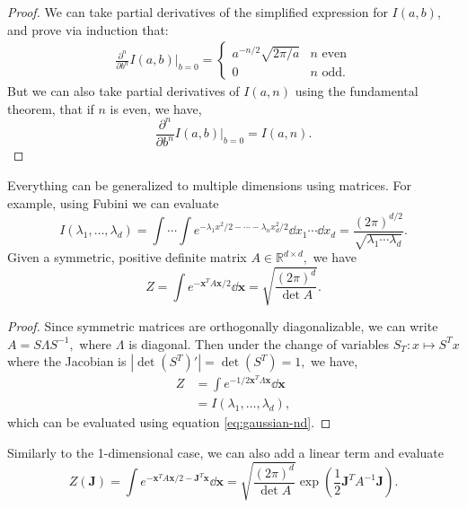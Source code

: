 \documentclass{article}
\numberwithin{equation}{section}
\begin{document}
\begin{proof}
    We can take partial derivatives of the simplified expression for $I(a,b)$, and prove via induction that:
    \begin{align*}
        \frac{\partial^n}{\partial b^n}I(a,b)\bigg|_{b=0} = \begin{cases}
            a^{-n/2}\sqrt{2\pi/a} & n \text{ even} \\
            0 & n \text{ odd}.
        \end{cases}
    \end{align*}
    But we can also take partial derivatives of $I(a,n)$ using the fundamental theorem, that if $n$ is even, we have,
    \begin{equation*}
        \frac{\partial^n}{\partial b^n}I(a,b)\bigg|_{b=0} = I(a,n).
    \end{equation*}
\end{proof}
Everything can be generalized to multiple dimensions using matrices. For example, using Fubini we can evaluate 
\begin{equation}
    \boxed{I(\lambda_1,\dots,\lambda_d) = \int\cdots \int e^{-\lambda_1x^2/2-\cdots -\lambda_nx_d^2/2}\dd{x_1}\cdots\dd{x_d} = \frac{(2\pi)^{d/2}}{\sqrt{\lambda_1\cdots\lambda_d}}.}
\end{equation}
Given a symmetric, positive definite matrix $A \in \mathbb{R}^{d\times d},$ we have 
\begin{equation}
    \boxed{Z = \int e^{-\bm{x}^T A \bm{x}/2} \dd{\bm{x}} = \sqrt{\frac{(2\pi)^d}{\det A}}.}
    \label{eq:gaussian-nd}
\end{equation}
\begin{proof}
    Since symmetric matrices are orthogonally diagonalizable, we can write $A=S\Lambda S^{-1},$ where $\Lambda$ is diagonal. Then under the change of variables $S_T:x \mapsto S^Tx$ where the Jacobian is $|\det (S^T)'| = \det (S^T) = 1,$ we have,
    \begin{align*}
        Z &= \int e^{-1/2 \bm{x}^T \Lambda \bm{x}} \dd{\bm{x}} \\ 
        &= I(\lambda_1,\dots,\lambda_d),
    \end{align*}
    which can be evaluated using equation \ref{eq:gaussian-nd}.
\end{proof}
Similarly to the 1-dimensional case, we can also add a linear term and evaluate 
\begin{equation}
    \boxed{Z(\bm{J}) = \int e^{-\bm{x}^TA\bm{x}/2 - \bm{J}^T\bm{x}}\dd{\bm{x}} = \sqrt{\frac{(2\pi)^d}{\det A}}\exp\left(\frac{1}{2}\bm{J}^TA^{-1}\bm{J}\right)}.
\end{equation}
\end{document}
